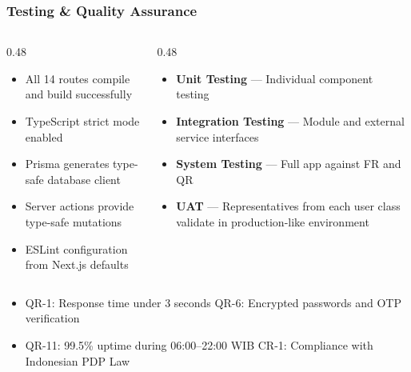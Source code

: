 \documentclass[aspectratio=169,professionalfonts,10pt]{beamer}
\begin{document}
\begin{frame}
    \frametitle{Testing \& Quality Assurance}
    \small
    \begin{columns}[T]
        \begin{column}{0.48\textwidth}
            \begin{tcolorbox}[colback=ugmLightGrey,colframe=ugmBlue,title=\small Build \& Type Safety]
                \scriptsize
                \begin{itemize}\setlength{\itemsep}{1pt}
                    \item All 14 routes compile and build successfully
                    \item TypeScript strict mode enabled
                    \item Prisma generates type-safe database client
                    \item Server actions provide type-safe mutations
                    \item ESLint configuration from Next.js defaults
                \end{itemize}
            \end{tcolorbox}
        \end{column}

        \begin{column}{0.48\textwidth}
            \begin{tcolorbox}[colback=ugmLightGrey,colframe=cucigoTeal,title=\small Verification Strategy (from SRS)]
                \scriptsize
                \begin{itemize}\setlength{\itemsep}{1pt}
                    \item \textbf{Unit Testing} --- Individual component testing
                    \item \textbf{Integration Testing} --- Module and external service interfaces
                    \item \textbf{System Testing} --- Full app against FR and QR
                    \item \textbf{UAT} --- Representatives from each user class validate in production-like environment
                \end{itemize}
            \end{tcolorbox}
        \end{column}
    \end{columns}

    \vspace{0.3em}
    \begin{tcolorbox}[colback=cucigoCoral!10,colframe=cucigoCoral,title=\small Quality Requirements Highlights]
        \scriptsize
        \begin{itemize}\setlength{\itemsep}{1pt}
            \item QR-1: Response time under 3 seconds \quad QR-6: Encrypted passwords and OTP verification
            \item QR-11: 99.5\% uptime during 06:00--22:00 WIB \quad CR-1: Compliance with Indonesian PDP Law
        \end{itemize}
    \end{tcolorbox}
\end{frame}
\end{document}
